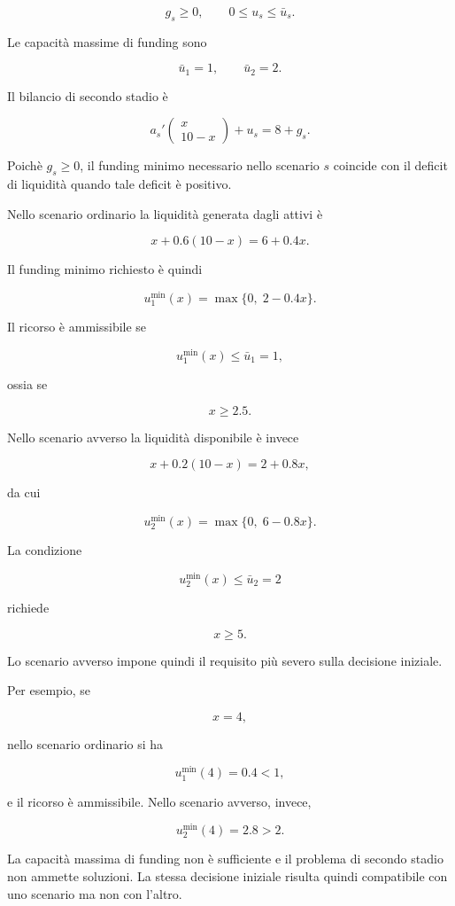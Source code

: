 \[
g_s\geq0,
\qquad
0\leq u_s\leq\bar u_s.
\]

Le capacit\`a massime di funding sono

\[
\bar u_1=1,
\qquad
\bar u_2=2.
\]

Il bilancio di secondo stadio \`e

\[
a_s'
\begin{pmatrix}
x\\
10-x
\end{pmatrix}
+
u_s
=
8+g_s.
\]

Poich\`e $g_s\geq0$, il funding minimo necessario nello scenario $s$ coincide
con il deficit di liquidit\`a quando tale deficit \`e positivo.

Nello scenario ordinario la liquidit\`a generata dagli attivi \`e

\[
x+0.6(10-x)
=
6+0.4x.
\]

Il funding minimo richiesto \`e quindi

\[
u_1^{\min}(x)
=
\max\{0,\;2-0.4x\}.
\]

Il ricorso \`e ammissibile se

\[
u_1^{\min}(x)
\leq
\bar u_1=1,
\]

ossia se

\[
x\geq2.5.
\]

Nello scenario avverso la liquidit\`a disponibile \`e invece

\[
x+0.2(10-x)
=
2+0.8x,
\]

da cui

\[
u_2^{\min}(x)
=
\max\{0,\;6-0.8x\}.
\]

La condizione

\[
u_2^{\min}(x)
\leq
\bar u_2=2
\]

richiede

\[
x\geq5.
\]

Lo scenario avverso impone quindi il requisito pi\`u severo sulla decisione
iniziale.

Per esempio, se

\[
x=4,
\]

nello scenario ordinario si ha

\[
u_1^{\min}(4)=0.4<1,
\]

e il ricorso \`e ammissibile. Nello scenario avverso, invece,

\[
u_2^{\min}(4)=2.8>2.
\]

La capacit\`a massima di funding non \`e sufficiente e il problema di secondo
stadio non ammette soluzioni. La stessa decisione iniziale risulta quindi
compatibile con uno scenario ma non con l'altro.

